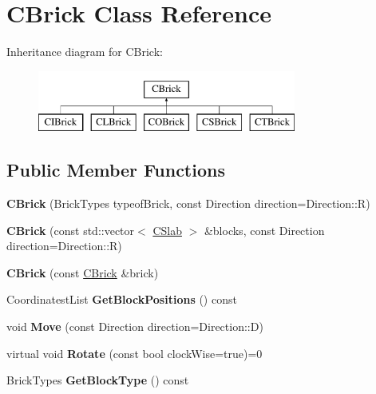 \hypertarget{classCBrick}{\section{C\-Brick Class Reference}
\label{classCBrick}
}
Inheritance diagram for C\-Brick\-:\begin{figure}[H]
\begin{center}
\leavevmode
\includegraphics[height=2.000000cm]{classCBrick}
\end{center}
\end{figure}
\subsection*{Public Member Functions}
\begin{DoxyCompactItemize}
\item 
\hypertarget{classCBrick_a7e9a7be334cf5fd214135c73188e5e3c}{{\bfseries C\-Brick} (Brick\-Types typeof\-Brick, const Direction direction=Direction\-::\-R)}\label{classCBrick_a7e9a7be334cf5fd214135c73188e5e3c}

\item 
\hypertarget{classCBrick_a384bfcee237653f7ee52424ae892036c}{{\bfseries C\-Brick} (const std\-::vector$<$ \hyperlink{classCSlab}{C\-Slab} $>$ \&blocks, const Direction direction=Direction\-::\-R)}\label{classCBrick_a384bfcee237653f7ee52424ae892036c}

\item 
\hypertarget{classCBrick_a6036490c7d05a6d7cf0a82aa492019d5}{{\bfseries C\-Brick} (const \hyperlink{classCBrick}{C\-Brick} \&brick)}\label{classCBrick_a6036490c7d05a6d7cf0a82aa492019d5}

\item 
\hypertarget{classCBrick_a8d2b23220a7ce8a9edc6f1570105ed4f}{Coordinatest\-List {\bfseries Get\-Block\-Positions} () const }\label{classCBrick_a8d2b23220a7ce8a9edc6f1570105ed4f}

\item 
\hypertarget{classCBrick_a52d81e87ea62278fb2f06fcbf76217ea}{void {\bfseries Move} (const Direction direction=Direction\-::\-D)}\label{classCBrick_a52d81e87ea62278fb2f06fcbf76217ea}

\item 
\hypertarget{classCBrick_ab80db254175cc8f3fb7f9359f9009ef0}{virtual void {\bfseries Rotate} (const bool clock\-Wise=true)=0}\label{classCBrick_ab80db254175cc8f3fb7f9359f9009ef0}

\item 
\hypertarget{classCBrick_a2db8a43893f212040daa6716c51d63fc}{Brick\-Types {\bfseries Get\-Block\-Type} () const }\label{classCBrick_a2db8a43893f212040daa6716c51d63fc}

\end{DoxyCompactItemize}
